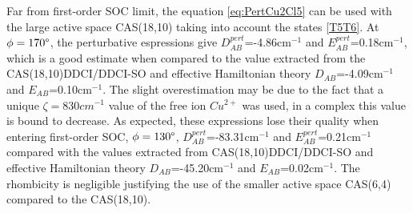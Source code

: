 \documentclass[10pt]{report}
\numberwithin{equation}{section}
\begin{document}
Far from first-order SOC limit, the equation \ref{eq:PertCu2Cl5} can be used with the large active space CAS(18,10) taking into account the states \ref{T5T6}.
At $\phi=170\degree$, the perturbative espressions give $D_{AB}^{pert}$=-4.86cm$^{-1}$ and $E_{AB}^{pert}$=0.18cm$^{-1}$, which is a good estimate when compared to the value extracted from the CAS(18,10)DDCI/DDCI-SO and effective Hamiltonian theory $D_{AB}$=-4.09cm$^{-1}$ and $E_{AB}$=0.10cm$^{-1}$.
The slight overestimation may be due to the fact that a unique $\zeta=830cm^{-1}$ value of the free ion $Cu^{2+}$ was used, in a complex this value is bound to decrease.
As expected, these expressions lose their quality when entering first-order SOC, $\phi=130\degree$, $D_{AB}^{pert}$=-83.31cm$^{-1}$ and $E_{AB}^{pert}$=0.21cm$^{-1}$ compared with the values extracted from CAS(18,10)DDCI/DDCI-SO and effective Hamiltonian theory $D_{AB}$=-45.20cm$^{-1}$ and $E_{AB}$=0.02cm$^{-1}$.
The rhombicity is negligible justifying the use of the smaller active space CAS(6,4) compared to the CAS(18,10).
\end{document}
